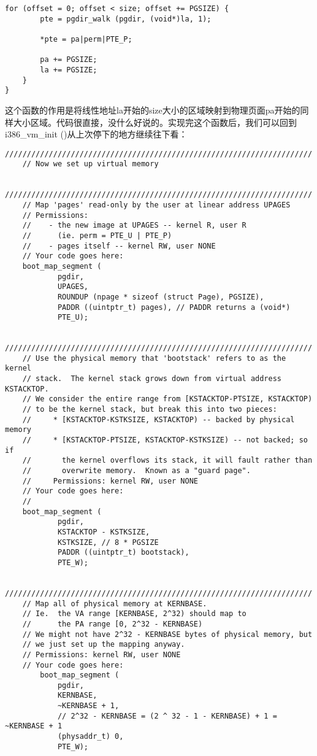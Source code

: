 \documentclass{article}
\newcommand{\funcname}[1]{{\ttfamily \small #1}}
\begin{document}
\begin{CJK*}{UTF8}{gkai}
\begin{lstlisting}[style=ccode, title={\scriptsize \ttfamily \bfseries kern/pmap.c: boot\_map\_segment ()}]
    for (offset = 0; offset < size; offset += PGSIZE) {
        pte = pgdir_walk (pgdir, (void*)la, 1);

        *pte = pa|perm|PTE_P;

        pa += PGSIZE;
        la += PGSIZE;
    }
}
\end{lstlisting}

这个函数的作用是将线性地址la开始的size大小的区域映射到物理页面pa开始的同样大小区域。代码很直接，没什么好说的。实现完这个函数后，我们可以回到\funcname{i386\_vm\_init ()}从上次停下的地方继续往下看：\label{addrmapping}



\begin{lstlisting}[style=ccode, title={\scriptsize \ttfamily \bfseries kern/pmap.c: i386\_vm\_init ()}]
	//////////////////////////////////////////////////////////////////////
	// Now we set up virtual memory 
	
	//////////////////////////////////////////////////////////////////////
	// Map 'pages' read-only by the user at linear address UPAGES
	// Permissions:
	//    - the new image at UPAGES -- kernel R, user R
	//      (ie. perm = PTE_U | PTE_P)
	//    - pages itself -- kernel RW, user NONE
	// Your code goes here:
	boot_map_segment (
            pgdir, 
            UPAGES, 
            ROUNDUP (npage * sizeof (struct Page), PGSIZE), 
            PADDR ((uintptr_t) pages), // PADDR returns a (void*)
            PTE_U);

	//////////////////////////////////////////////////////////////////////
	// Use the physical memory that 'bootstack' refers to as the kernel
	// stack.  The kernel stack grows down from virtual address KSTACKTOP.
	// We consider the entire range from [KSTACKTOP-PTSIZE, KSTACKTOP) 
	// to be the kernel stack, but break this into two pieces:
	//     * [KSTACKTOP-KSTKSIZE, KSTACKTOP) -- backed by physical memory
	//     * [KSTACKTOP-PTSIZE, KSTACKTOP-KSTKSIZE) -- not backed; so if
	//       the kernel overflows its stack, it will fault rather than
	//       overwrite memory.  Known as a "guard page".
	//     Permissions: kernel RW, user NONE
	// Your code goes here:
	//
	boot_map_segment (
            pgdir,
            KSTACKTOP - KSTKSIZE,
            KSTKSIZE, // 8 * PGSIZE
            PADDR ((uintptr_t) bootstack),
            PTE_W);

	//////////////////////////////////////////////////////////////////////
	// Map all of physical memory at KERNBASE. 
	// Ie.  the VA range [KERNBASE, 2^32) should map to
	//      the PA range [0, 2^32 - KERNBASE)
	// We might not have 2^32 - KERNBASE bytes of physical memory, but
	// we just set up the mapping anyway.
	// Permissions: kernel RW, user NONE
	// Your code goes here: 
        boot_map_segment (
            pgdir,
            KERNBASE,
            ~KERNBASE + 1, 
            // 2^32 - KERNBASE = (2 ^ 32 - 1 - KERNBASE) + 1 = ~KERNBASE + 1
            (physaddr_t) 0,
            PTE_W); 
\end{lstlisting}


\end{CJK*}
\end{document}
